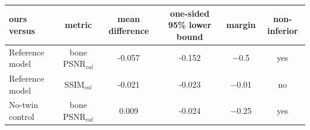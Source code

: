 \begin{tabular}{lccccc}
\toprule
ours versus & metric & mean difference & one-sided 95\% lower bound & margin & non-inferior \\
\midrule
Reference model & bone PSNR$_{cal}$ & -0.057 & -0.152 & $-$0.5 & yes \\
Reference model & SSIM$_{cal}$ & -0.021 & -0.023 & $-$0.01 & no \\
No-twin control & bone PSNR$_{cal}$ & 0.009 & -0.024 & $-$0.25 & yes \\
\bottomrule
\end{tabular}
